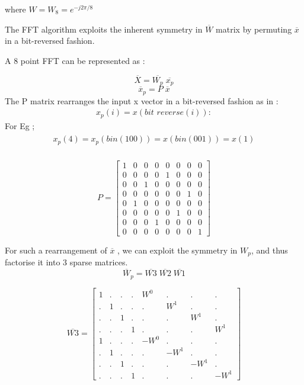 \documentclass[journal,12pt,twocolumn]{IEEEtran}
\renewcommand\thesection{\arabic{section}}
\begin{document}
\begin{enumerate}[label=\thesection.\arabic*.,ref=\thesection.\theenumi]
where $ W = W_{8} = e^{-j2\pi/8}$ \bigskip

The FFT algorithm exploits the inherent symmetry in $\overline{W}$ matrix by permuting $\overline{x}$ in a bit-reversed fashion.

A 8 point FFT can be represented as :

    $$\overline{X} = \overline{W_p}\;  \overline{x_p}$$\newline
    $$\overline{x}_{p} = P \; \overline{x}$$  
The P matrix rearranges the input x vector in a bit-reversed fashion as in : 
\begin{align}
    x_{p}(i) = x(\textit{bit reverse}(i)):
\end{align}
For Eg ; 
\begin{align}
\begin{split}
  x_{p}(4) = x_{p}(bin(100)) = x(bin(001)) = x(1)\\
\end{split}
\end{align}

\begin{equation}
    P = 
    \begin{bmatrix}
1 & 0 & 0 & 0 & 0 & 0 & 0 & 0 \\
0 & 0 & 0 & 0 & 1 & 0 & 0 & 0 \\
0 & 0 & 1 & 0 & 0 & 0 & 0 & 0 \\
0 & 0 & 0 & 0 & 0 & 0 & 1 & 0 \\
0 & 1 & 0 & 0 & 0 & 0 & 0 & 0 \\
0 & 0 & 0 & 0 & 0 & 1 & 0 & 0 \\
0 & 0 & 0 & 1 & 0 & 0 & 0 & 0 \\
0 & 0 & 0 & 0 & 0 & 0 & 0 & 1  

    \end{bmatrix}
\end{equation}

For such a rearrangement of $\overline{x}$ , we can exploit the symmetry in $W_{p}$, and thus factorise it into 3 sparse matrices.
\begin{equation}
    \overline{W}_{p} = \overline{W3} \; \overline{W2}\;\overline{W1}
\end{equation}


\begin{equation}
\overline{W3}
=
\begin{bmatrix}

1&.&.&.&W^{0}&.&.&. \\
.&1&.&.&.&W^{1}&.&. \\
.&.&1&.&.&.&W^{1}&. \\
.&.&.&1&.&.&.&W^{1} \\
1&.&.&.&-W^{0}&.&.&. \\
.&1&.&.&.&-W^{1}&.&. \\
.&.&1&.&.&.&-W^{1}&. \\
.&.&.&1&.&.&.&-W^{1} 


\end{bmatrix}
\end{equation}
\end{enumerate}
\end{document}
